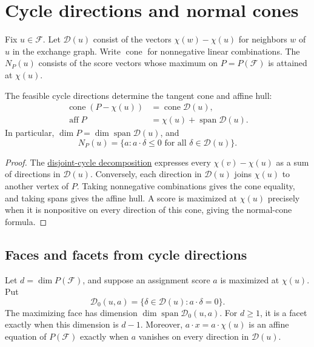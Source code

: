 \section[cycleCones]{Cycle directions and normal cones}

Fix $u\in\mathcal F$. Let $\mathcal D(u)$ consist of the vectors
$\chi(w)-\chi(u)$ for neighbors $w$ of $u$ in the exchange graph.
Write $\operatorname{cone}$ for nonnegative linear combinations.
The  $N_P(u)$ consists of the score vectors whose
maximum on $P=P(\mathcal F)$ is attained at $\chi(u)$.

\begin{theorem}
The feasible cycle directions determine the tangent cone and affine hull:
\[
 \begin{aligned}
 \operatorname{cone}(P-\chi(u))&=\operatorname{cone}\mathcal D(u),\\
 \operatorname{aff}P&=\chi(u)+\operatorname{span}\mathcal D(u).
 \end{aligned}
\]
In particular, $\dim P=\dim\operatorname{span}\mathcal D(u)$, and
\[
 N_P(u)=\{a:a\cdot\delta\leq0\text{ for all }\delta\in\mathcal D(u)\}.
\]
\end{theorem}

\begin{proof}
The \href{exchange-graphs.htm#disjointCycles}{disjoint-cycle decomposition}
expresses every $\chi(v)-\chi(u)$ as a sum of directions in
$\mathcal D(u)$. Conversely, each direction in $\mathcal D(u)$ joins
$\chi(u)$ to another vertex of $P$. Taking nonnegative combinations
gives the cone equality, and taking spans gives the affine hull.
A score is maximized at $\chi(u)$ precisely when it is nonpositive
on every direction of this cone, giving the normal-cone formula.
\end{proof}

\subsection[cycleFacetTest]{Faces and facets from cycle directions}

\begin{corollary}
Let $d=\dim P(\mathcal F)$, and suppose an assignment score $a$ is
maximized at $\chi(u)$. Put
\[
 \mathcal D_0(u,a)=
 \{\delta\in\mathcal D(u):a\cdot\delta=0\}.
\]
The maximizing face has dimension
$\dim\operatorname{span}\mathcal D_0(u,a)$.
For $d\geq1$, it is a facet exactly when this dimension is $d-1$.
Moreover, $a\cdot x=a\cdot\chi(u)$ is an affine equation of
$P(\mathcal F)$ exactly when $a$ vanishes on every direction in
$\mathcal D(u)$.
\end{corollary}

